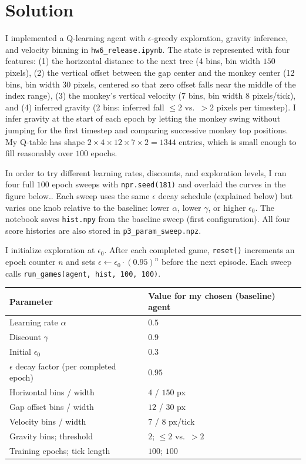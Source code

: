 \documentclass[submit]{../harvardml}
\newenvironment{solution}
  {\color{blue}\section*{Solution}}
{}
\begin{document}
\begin{solution}

I implemented a Q-learning agent with $\epsilon$-greedy exploration, gravity inference, and velocity binning in \texttt{hw6\_release.ipynb}. The state is represented with four features: (1) the horizontal distance to the next tree (4 bins, bin width $150$ pixels), (2) the vertical offset between the gap center and the monkey center (12 bins, bin width $30$ pixels, centered so that zero offset falls near the middle of the index range), (3) the monkey's vertical velocity (7 bins, bin width $8$ pixels/tick), and (4) inferred gravity (2 bins: inferred fall $\le 2$ vs.\ $> 2$ pixels per timestep). I infer gravity at the start of each epoch by letting the monkey swing without jumping for the first timestep and comparing successive monkey top positions. My Q-table has shape $2 \times 4 \times 12 \times 7 \times 2 = 1344$ entries, which is small enough to fill reasonably over $100$ epochs.

In order to try different learning rates, discounts, and exploration levels, I ran four full $100$ epoch sweeps with \texttt{npr.seed(181)} and overlaid the curves in the figure below.. Each sweep uses the same $\epsilon$ decay schedule (explained below) but varies one knob relative to the baseline: lower $\alpha$, lower $\gamma$, or higher $\epsilon_0$. The notebook saves \texttt{hist.npy} from the baseline sweep (first configuration). All four score histories are also stored in \texttt{p3\_param\_sweep.npz}.

I initialize exploration at $\epsilon_0$. After each completed game, \texttt{reset()} increments an epoch counter $n$ and sets $\epsilon \leftarrow \epsilon_0 \cdot (0.95)^{n}$ before the next episode. Each sweep calls \texttt{run\_games(agent, hist, 100, 100)}.

\begin{center}
\begin{tabular}{@{}ll@{}}
\hline
\textbf{Parameter} & \textbf{Value for my chosen (baseline) agent} \\
\hline
Learning rate $\alpha$ & $0.5$ \\
Discount $\gamma$ & $0.9$ \\
Initial $\epsilon_0$ & $0.3$ \\
$\epsilon$ decay factor (per completed epoch) & $0.95$ \\
Horizontal bins / width & $4$ / $150$ px \\
Gap offset bins / width & $12$ / $30$ px \\
Velocity bins / width & $7$ / $8$ px/tick \\
Gravity bins; threshold & $2$; $\le 2$ vs.\ $> 2$ \\
Training epochs; tick length & $100$; $100$ \\
\hline
\end{tabular}
\end{center}


\end{solution}
\end{document}
